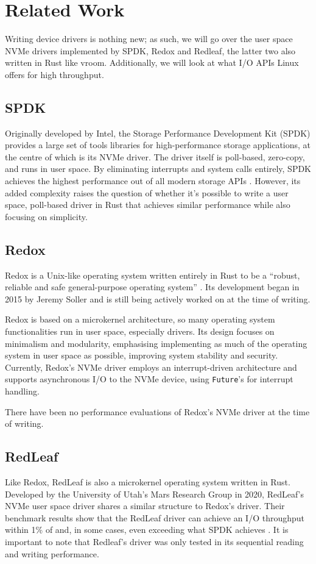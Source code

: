 \chapter{Related Work}\label{chapter:related}
Writing device drivers is nothing new; as such, we will go over the user space NVMe drivers implemented by SPDK, Redox and Redleaf, the latter two also written in Rust like vroom. Additionally, we will look at what I/O APIs Linux offers for high throughput.

\section{SPDK}
Originally developed by Intel, the Storage Performance Development Kit (SPDK) provides a large set of tools libraries for high-performance storage applications, at the centre of which is its NVMe driver. The driver itself is poll-based, zero-copy, and runs in user space. By eliminating interrupts and system calls entirely, SPDK achieves the highest performance out of all modern storage APIs \cite{storage_api}. However, its added complexity raises the question of whether it's possible to write a user space, poll-based driver in Rust that achieves similar performance while also focusing on simplicity.

\section{Redox}
Redox is a Unix-like operating system written entirely in Rust to be a ``robust, reliable and safe general-purpose operating system'' \cite{redox}. Its development began in 2015 by Jeremy Soller and is still being actively worked on at the time of writing.

Redox is based on a microkernel architecture, so many operating system functionalities run in user space, especially drivers. Its design focuses on minimalism and modularity, emphasising implementing as much of the operating system in user space as possible, improving system stability and security. Currently, Redox's NVMe driver employs an interrupt-driven architecture and supports asynchronous I/O to the NVMe device, using \texttt{Future}'s for interrupt handling.

There have been no performance evaluations of Redox's NVMe driver at the time of writing.

\section{RedLeaf}
Like Redox, RedLeaf \cite{redleaf-page} is also a microkernel operating system written in Rust. Developed by the University of Utah's Mars Research Group in 2020, RedLeaf's NVMe user space driver shares a similar structure to Redox's driver. Their benchmark results show that the RedLeaf driver can achieve an I/O throughput within 1\% of and, in some cases, even exceeding what SPDK achieves \cite{redleaf}. It is important to note that Redleaf's driver was only tested in its sequential reading and writing performance.

